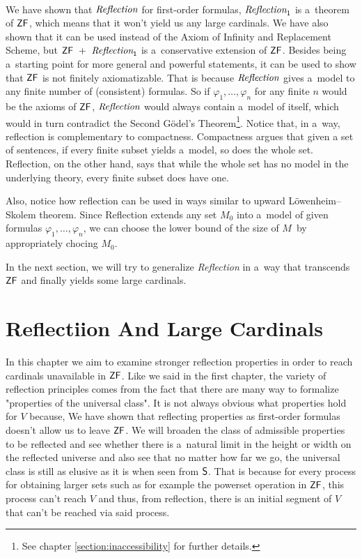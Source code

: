 \documentclass[12pt,a4paper]{article}
\begin{document}
\

We have shown that $\emph{Reflection}$ for first-order formulas, $\emph{Reflection}_1$ is a~theorem of $\sf{ZF}$, which means that it won't yield us any large cardinals. We have also shown that it can be used instead of the Axiom of Infinity and Replacement Scheme, but $\sf{ZF}\ +\ \emph{Reflection}_1$ is a~conservative extension of $\sf{ZF}$. Besides being a~starting point for more general and powerful statements, it can be used to show that $\sf{ZF}$ is not finitely axiomatizable. That is because $\emph{Reflection}$ gives a~model to any finite number of (consistent) formulas. So if $\varphi_1, \ldots, \varphi_n$ for any finite $n$ would be the axioms of $\sf{ZF}$, $\emph{Reflection}$ would always contain a~model of itself, which would in turn contradict the Second Gödel's Theorem\footnote{See chapter \ref{section:inaccessibility} for further details.}.
Notice that, in a~way, reflection is complementary to compactness. Compactness argues that given a set of sentences, if every finite subset yields a~model, so does the whole set. Reflection, on the other hand, says that while the whole set has no model in the underlying theory, every finite subset does have one.

Also, notice how reflection can be used in ways similar to upward Löwenheim–Skolem theorem. Since Reflection extends any set $M_0$ into a~model of given formulas $\varphi_1, \ldots, \varphi_n$, we can choose the lower bound of the size of $M$ by appropriately chocing $M_0$.

In the next section, we will try to generalize \emph{Reflection} in a~way that transcends $\sf{ZF}$ and finally yields some large cardinals.

\newpage
\section{Reflectiion And Large Cardinals}

In this chapter we aim to examine stronger reflection properties in order to reach cardinals unavailable in $\sf{ZF}$. Like we said in the first chapter, %
the variety of reflection principles comes from the fact that there are many way to formalize "properties of the universal class". It is not always obvious what properties hold for $V$ because, 
We have shown that reflecting properties as first-order formulas doesn't allow us to leave $\sf{ZF}$. We will broaden the class of admissible properties to be reflected and see whether there is a~natural limit in the height or width on the reflected universe and also see that no matter how far we go, the universal class is still as elusive as it is when seen from $\sf{S}$. That is because for every process for obtaining larger sets such as for example the powerset operation in $\sf{ZF}$, this process can't reach $V$ and thus, from reflection, there is an initial segment of $V$ that can't be reached via said process. 
\end{document}
